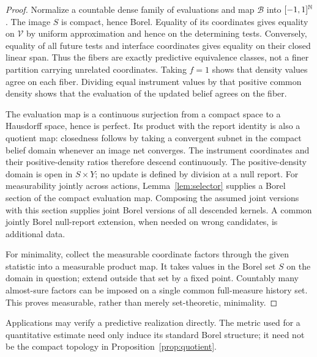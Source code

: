 \begin{proof}
Normalize a countable dense family of evaluations and map $\mathcal B$ into $[-1,1]^{\mathbb N}$. The image $S$ is compact, hence Borel. Equality of its coordinates gives equality on $\mathcal V$ by uniform approximation and hence on the determining tests. Conversely, equality of all future tests and interface coordinates gives equality on their closed linear span. Thus the fibers are exactly predictive equivalence classes, not a finer partition carrying unrelated coordinates. Taking $f=1$ shows that density values agree on each fiber. Dividing equal instrument values by that positive common density shows that the evaluation of the updated belief agrees on the fiber.

The evaluation map is a continuous surjection from a compact space to a Hausdorff space, hence is perfect. Its product with the report identity is also a quotient map: closedness follows by taking a convergent subnet in the compact belief domain whenever an image net converges. The instrument coordinates and their positive-density ratios therefore descend continuously. The positive-density domain is open in $S\times Y$; no update is defined by division at a null report. For measurability jointly across actions, Lemma~\ref{lem:selector} supplies a Borel section of the compact evaluation map. Composing the assumed joint versions with this section supplies joint Borel versions of all descended kernels. A common jointly Borel null-report extension, when needed on wrong candidates, is additional data.

For minimality, collect the measurable coordinate factors through the given statistic into a measurable product map. It takes values in the Borel set $S$ on the domain in question; extend outside that set by a fixed point. Countably many almost-sure factors can be imposed on a single common full-measure history set. This proves measurable, rather than merely set-theoretic, minimality.
\end{proof}

Applications may verify a predictive realization directly. The metric used for a quantitative estimate need only induce its standard Borel structure; it need not be the compact topology in Proposition~\ref{prop:quotient}.

